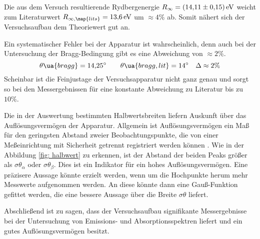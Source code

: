 Die aus dem Versuch resultierende Rydbergenergie $R_\infty=\SI{14.11\pm0.15}{\eV}$ weicht zum Literaturwert \cite{anleitung602}
$R_{\infty,\map{lits}}=\SI{13.6}{\eV}$ um $\approx 4 \%$ ab. Somit nähert sich der
Versuchsaufbau dem Theoriewert gut an.

Ein systematischer Fehler bei der Apparatur ist wahrscheinlich, denn auch bei der
Untersuchung der Bragg-Bedingung gibt es eine Abweichung von $\approx 2\%$.
\begin{equation*}
  \theta\ua{bragg}=\SI{14.25}{\degree}  \qquad \theta\ua{bragg,lit}=\SI{14}{\degree} \quad \Delta\approx2\%
\end{equation*}
Scheinbar ist die Feinjustage der Versuchsapparatur nicht ganz genau und sorgt so bei den Messergebnissen
für eine konstante Abweichung zu Literatur bis zu $10\%$.

Die in der Auswertung bestimmten Halbwertsbreiten liefern Auskunft über das
Auflösungsvermögen der Apparatur.
Allgemein ist Auflösungsvermögen ein Maß für den geringsten Abstand zweier Beobachtungspunkte,
die von einer Meßeinrichtung mit Sicherheit getrennt registriert werden können \cite{aufloes}.
Wie in der Abbildung \ref{fig: halbwert} zu erkennen, ist der Abstand der beiden Peaks
größer als $\sigma\theta_\alpha$ oder $\sigma\theta_\beta$. Dies ist ein Indikator
für ein hohes Auflösungsvermögen. Eine präzisere Aussage könnte erzielt werden,
wenn um die Hochpunkte herum mehr Messwerte aufgenommen werden. An diese
könnte dann eine Gauß-Funktion gefittet werden, die eine bessere Aussage über die
Breite $\sigma\theta$ liefert.

Abschließend ist zu sagen, dass der Versuchsaufbau signifikante Messergebnisse
bei der Untersuchung von Emissions- und Absorptionsspektren liefert und ein
gutes Auflösungsvermögen besitzt.
